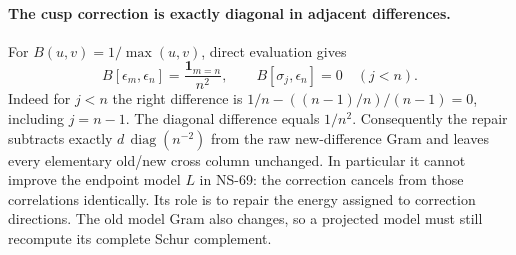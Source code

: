 \paragraph{The cusp correction is exactly diagonal in adjacent differences.}
For $B(u,v)=1/\max(u,v)$, direct evaluation gives
\[
 B[\epsilon_m,\epsilon_n]=\frac{\mathbf1_{m=n}}{n^2},
 \qquad B[\sigma_j,\epsilon_n]=0\quad(j<n).
\]
Indeed for $j<n$ the right difference is
$1/n-((n-1)/n)/(n-1)=0$, including $j=n-1$.
The diagonal difference equals $1/n^2$. Consequently the repair
subtracts exactly $d\,\operatorname{diag}(n^{-2})$ from the raw
new-difference Gram and leaves every elementary old/new cross column
unchanged. In particular it cannot improve the endpoint model $L$
in NS-69: the correction cancels from those correlations identically.
Its role is to repair the energy assigned to correction directions.
The old model Gram also changes, so a projected model must still
recompute its complete Schur complement.

